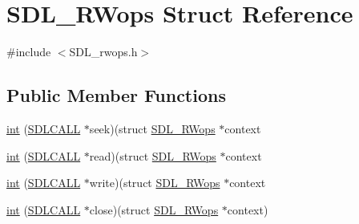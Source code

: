 \hypertarget{struct_s_d_l___r_wops}{}\section{S\+D\+L\+\_\+\+R\+Wops Struct Reference}
\label{struct_s_d_l___r_wops}


{\ttfamily \#include $<$S\+D\+L\+\_\+rwops.\+h$>$}

\subsection*{Public Member Functions}
\begin{DoxyCompactItemize}
\item 
\hyperlink{struct_s_d_l___r_wops_a25b6f8f86737e5f6af594d4069885771}{int} (\hyperlink{begin__code_8h_a81faf4ba0455dc75f2e0507eddb79401}{S\+D\+L\+C\+A\+L\+L} $\ast$seek)(struct \hyperlink{struct_s_d_l___r_wops}{S\+D\+L\+\_\+\+R\+Wops} $\ast$context
\item 
\hyperlink{struct_s_d_l___r_wops_a22a0344f0e73d5917aa0dc91417e44a1}{int} (\hyperlink{begin__code_8h_a81faf4ba0455dc75f2e0507eddb79401}{S\+D\+L\+C\+A\+L\+L} $\ast$read)(struct \hyperlink{struct_s_d_l___r_wops}{S\+D\+L\+\_\+\+R\+Wops} $\ast$context
\item 
\hyperlink{struct_s_d_l___r_wops_a281fa6bf3562d8289f9ef75f658b5a44}{int} (\hyperlink{begin__code_8h_a81faf4ba0455dc75f2e0507eddb79401}{S\+D\+L\+C\+A\+L\+L} $\ast$write)(struct \hyperlink{struct_s_d_l___r_wops}{S\+D\+L\+\_\+\+R\+Wops} $\ast$context
\item 
\hyperlink{struct_s_d_l___r_wops_ab303bcbb0f6742a141ba8b2998923f47}{int} (\hyperlink{begin__code_8h_a81faf4ba0455dc75f2e0507eddb79401}{S\+D\+L\+C\+A\+L\+L} $\ast$close)(struct \hyperlink{struct_s_d_l___r_wops}{S\+D\+L\+\_\+\+R\+Wops} $\ast$context)
\end{DoxyCompactItemize}

